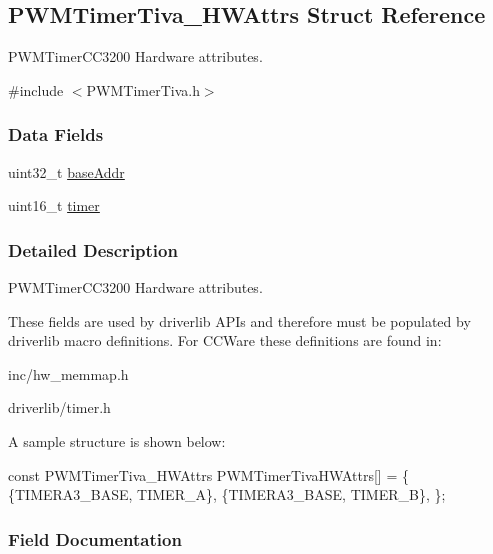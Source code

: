 \subsection{P\+W\+M\+Timer\+Tiva\+\_\+\+H\+W\+Attrs Struct Reference}
\label{struct_p_w_m_timer_tiva___h_w_attrs}


P\+W\+M\+Timer\+C\+C3200 Hardware attributes.  




{\ttfamily \#include $<$P\+W\+M\+Timer\+Tiva.\+h$>$}

\subsubsection*{Data Fields}
\begin{DoxyCompactItemize}
\item 
uint32\+\_\+t \hyperlink{struct_p_w_m_timer_tiva___h_w_attrs_a1514de8d9b83a66fbed22b8427d20655}{base\+Addr}
\item 
uint16\+\_\+t \hyperlink{struct_p_w_m_timer_tiva___h_w_attrs_aa14d05c47183c46a7314da656125bbc9}{timer}
\end{DoxyCompactItemize}


\subsubsection{Detailed Description}
P\+W\+M\+Timer\+C\+C3200 Hardware attributes. 

These fields are used by driverlib A\+P\+Is and therefore must be populated by driverlib macro definitions. For C\+C\+Ware these definitions are found in\+:
\begin{DoxyItemize}
\item inc/hw\+\_\+memmap.\+h
\item driverlib/timer.\+h
\end{DoxyItemize}

A sample structure is shown below\+: 
\begin{DoxyCode}
\textcolor{keyword}{const} PWMTimerTiva_HWAttrs PWMTimerTivaHWAttrs[] = \{
    \{TIMERA3\_BASE, TIMER\_A\},
    \{TIMERA3\_BASE, TIMER\_B\},
\};
\end{DoxyCode}
 

\subsubsection{Field Documentation}
